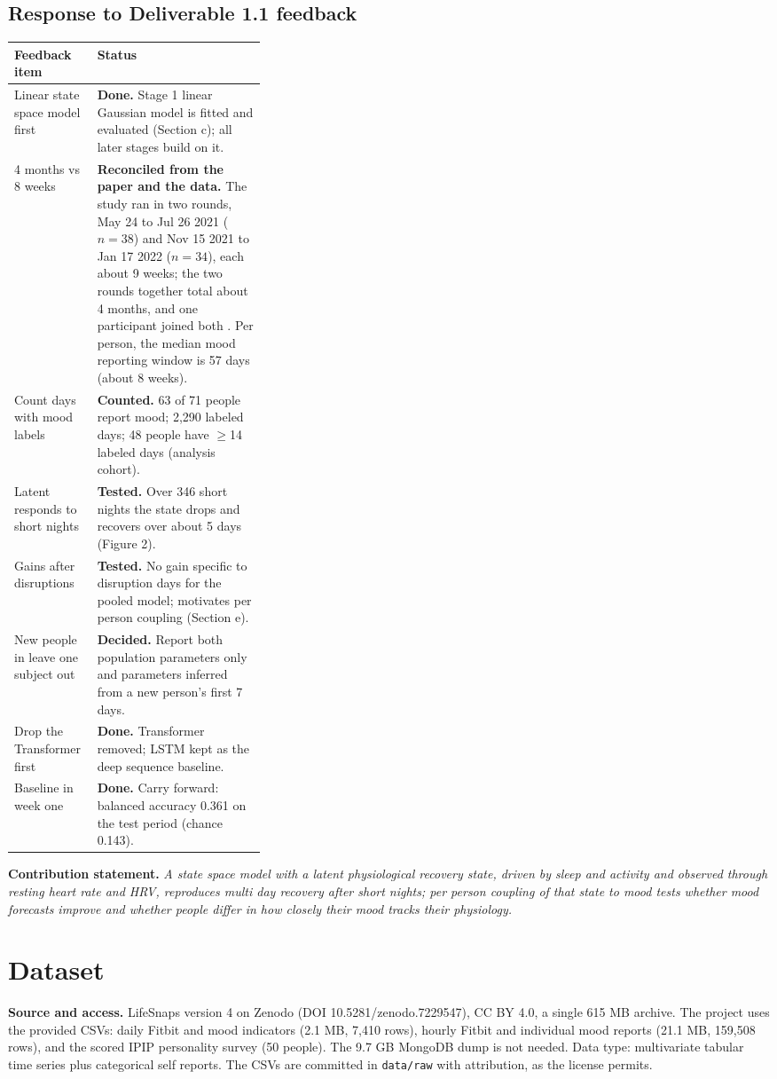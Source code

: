 \documentclass[11pt]{article}
\begin{document}
\subsection{Response to Deliverable 1.1 feedback}
\begin{tabularx}{\linewidth}{@{}p{0.33\linewidth}X@{}}
\toprule
Feedback item & Status \\ \midrule
Linear state space model first & \textbf{Done.} Stage 1 linear Gaussian model is fitted and evaluated (Section c); all later stages build on it. \\
4 months vs 8 weeks & \textbf{Reconciled from the paper and the data.} The study ran in two rounds, May 24 to Jul 26 2021 ($n{=}38$) and Nov 15 2021 to Jan 17 2022 ($n{=}34$), each about 9 weeks; the two rounds together total about 4 months, and one participant joined both \cite{lifesnaps}. Per person, the median mood reporting window is 57 days (about 8 weeks). \\
Count days with mood labels & \textbf{Counted.} 63 of 71 people report mood; 2{,}290 labeled days; 48 people have $\geq$14 labeled days (analysis cohort). \\
Latent responds to short nights & \textbf{Tested.} Over 346 short nights the state drops and recovers over about 5 days (Figure 2). \\
Gains after disruptions & \textbf{Tested.} No gain specific to disruption days for the pooled model; motivates per person coupling (Section e). \\
New people in leave one subject out & \textbf{Decided.} Report both population parameters only and parameters inferred from a new person's first 7 days. \\
Drop the Transformer first & \textbf{Done.} Transformer removed; LSTM kept as the deep sequence baseline. \\
Baseline in week one & \textbf{Done.} Carry forward: balanced accuracy 0.361 on the test period (chance 0.143). \\
\bottomrule
\end{tabularx}

\textbf{Contribution statement.} \emph{A state space model with a latent physiological recovery state, driven by sleep and activity and observed through resting heart rate and HRV, reproduces multi day recovery after short nights; per person coupling of that state to mood tests whether mood forecasts improve and whether people differ in how closely their mood tracks their physiology.}

\section{Dataset}
\textbf{Source and access.} LifeSnaps version 4 on Zenodo (DOI 10.5281/zenodo.7229547), CC BY 4.0, a single 615 MB archive. The project uses the provided CSVs: daily Fitbit and mood indicators (2.1 MB, 7{,}410 rows), hourly Fitbit and individual mood reports (21.1 MB, 159{,}508 rows), and the scored IPIP personality survey (50 people). The 9.7 GB MongoDB dump is not needed. Data type: multivariate tabular time series plus categorical self reports. The CSVs are committed in \texttt{data/raw} with attribution, as the license permits.
\end{document}
